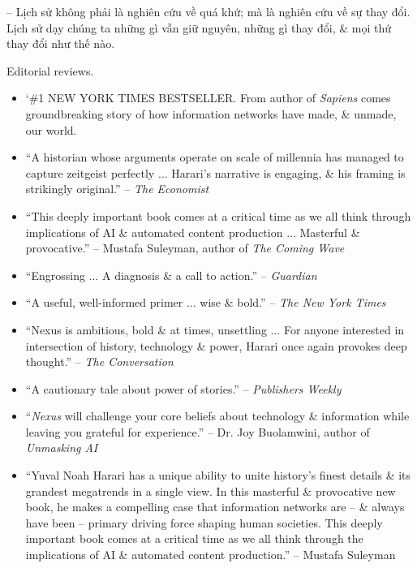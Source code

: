 \documentclass{article}
\begin{document}
\begin{enumerate}
\begin{itemize}
        -- Lịch sử không phải là nghiên cứu về quá khứ; mà là nghiên cứu về sự thay đổi. Lịch sử dạy chúng ta những gì vẫn giữ nguyên, những gì thay đổi, \& mọi thứ thay đổi như thế nào.
    \end{itemize}
    {\sf Editorial reviews.}
    \begin{itemize}
        \item `\#1 NEW YORK TIMES BESTSELLER. From author of {\it Sapiens} comes groundbreaking story of how information networks have made, \& unmade, our world.

        \item ``A historian whose arguments operate on scale of millennia has managed to capture zeitgeist perfectly $\ldots$ {\sc Harari}'s narrative is engaging, \& his framing is strikingly original.'' -- {\it The Economist}

        \item ``This deeply important book comes at a critical time as we all think through implications of AI \& automated content production $\ldots$ Masterful \& provocative.'' -- {\sc Mustafa Suleyman}, author of {\it The Coming Wave}

        \item ``Engrossing $\ldots$ A diagnosis \& a call to action.'' -- {\it Guardian}

        \item ``A useful, well-informed primer $\ldots$ wise \& bold.'' -- {\it The New York Times}

        \item ``Nexus is ambitious, bold \& at times, unsettling $\ldots$ For anyone interested in intersection of history, technology \& power, {\sc Harari} once again provokes deep thought.'' -- {\it The Conversation}

        \item ``A cautionary tale about power of stories.'' -- {\it Publishers Weekly}

        \item ``{\it Nexus} will challenge your core beliefs about technology \& information while leaving you grateful for experience.'' -- Dr. {\sc Joy Buolamwini}, author of {\it Unmasking AI}

        \item ``{\sc Yuval Noah Harari} has a unique ability to unite history's finest details \& its grandest megatrends in a single view. In this masterful \& provocative new book, he makes a compelling case that information networks are -- \& always have been -- primary driving force shaping human societies. This deeply important book comes at a critical time as we all think through the implications of AI \& automated content production.'' -- {\sc Mustafa Suleyman}


\end{itemize}
\end{enumerate}
\end{document}
